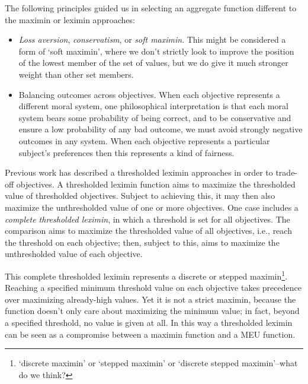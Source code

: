 The following principles guided us in selecting an aggregate function different to the maximin or leximin approaches:
\begin{itemize}
    \item \textit{Loss aversion}, \textit{conservatism}, or \textit{soft maximin}. This might be considered a form of `soft maximin', where we don't strictly look to improve the position of the lowest member of the set of values, but we do give it much stronger weight than other set members.
    \item Balancing outcomes across objectives. When each objective represents a different moral system, one philosophical interpretation is that each moral system bears some probability of being correct, and to be conservative and ensure a low probability of any bad outcome, we must avoid strongly negative outcomes in any system. When each objective represents a particular subject's preferences then this represents a kind of fairness.
\end{itemize}

Previous work \cite{vamplew_potential-based_2021} has described a thresholded leximin approaches in order to trade-off objectives. A thresholded leximin function aims to maximize the thresholded value of thresholded objectives. Subject to achieving this, it may then also maximize the unthresholded value of one or more objectives. One case includes a \textit{complete thresholded leximin}, in which a threshold is set for all objectives. The comparison aims to maximize the thresholded value of all objectives, i.e., reach the threshold on each objective; then, subject to this, aims to maximize the unthresholded value of each objective.

This complete thresholded leximin represents a discrete or stepped maximin\footnote{`discrete maximin' or `stepped maximin' or `discrete stepped maximin'--what do we think?}. Reaching a specified minimum threshold value on each objective takes precedence over maximizing already-high values. Yet it is not a strict maximin, because the function doesn't only care about maximizing the minimum value; in fact, beyond a specified threshold, no value is given at all. In this way a thresholded leximin can be seen as a compromise between a maximin function and a MEU function.


